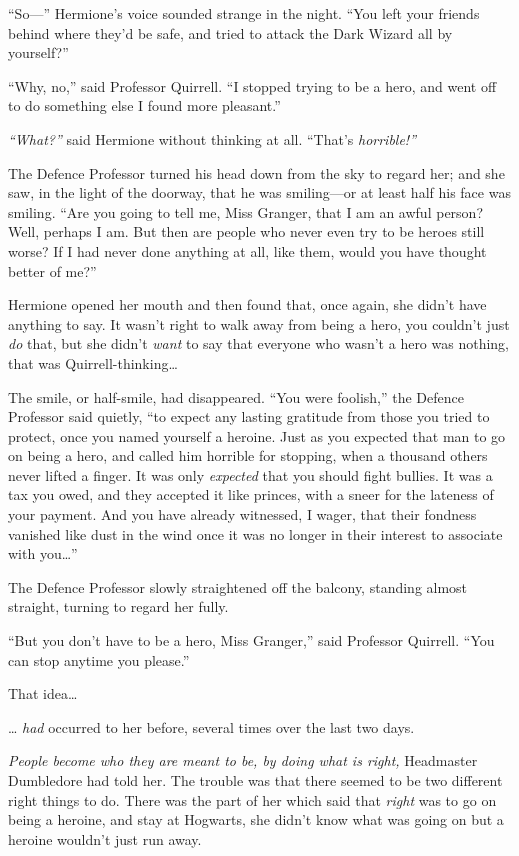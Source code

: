 ``So---'' Hermione's voice sounded strange in the night. ``You left your
friends behind where they'd be safe, and tried to attack the Dark Wizard
all by yourself?''

``Why, no,'' said Professor Quirrell. ``I stopped trying to be a hero,
and went off to do something else I found more pleasant.''

\emph{``What?''} said Hermione without thinking at all. ``That's
\emph{horrible!''}

The Defence Professor turned his head down from the sky to regard her;
and she saw, in the light of the doorway, that he was smiling---or at
least half his face was smiling. ``Are you going to tell me, Miss
Granger, that I am an awful person? Well, perhaps I am. But then are
people who never even try to be heroes still worse? If I had never done
anything at all, like them, would you have thought better of me?''

Hermione opened her mouth and then found that, once again, she didn't
have anything to say. It wasn't right to walk away from being a hero,
you couldn't just \emph{do} that, but she didn't \emph{want} to say that
everyone who wasn't a hero was nothing, that was
Quirrell-thinking\ldots{}

The smile, or half-smile, had disappeared. ``You were foolish,'' the
Defence Professor said quietly, ``to expect any lasting gratitude from
those you tried to protect, once you named yourself a heroine. Just as
you expected that man to go on being a hero, and called him horrible for
stopping, when a thousand others never lifted a finger. It was only
\emph{expected} that you should fight bullies. It was a tax you owed,
and they accepted it like princes, with a sneer for the lateness of your
payment. And you have already witnessed, I wager, that their fondness
vanished like dust in the wind once it was no longer in their interest
to associate with you\ldots{}''

The Defence Professor slowly straightened off the balcony, standing
almost straight, turning to regard her fully.

``But you don't have to be a hero, Miss Granger,'' said Professor
Quirrell. ``You can stop anytime you please.''

That idea\ldots{}

\ldots{} \emph{had} occurred to her before, several times over the last
two days.

\emph{People become who they are meant to be, by doing what is right,}
Headmaster Dumbledore had told her. The trouble was that there seemed to
be two different right things to do. There was the part of her which
said that \emph{right} was to go on being a heroine, and stay at
Hogwarts, she didn't know what was going on but a heroine wouldn't just
run away.

